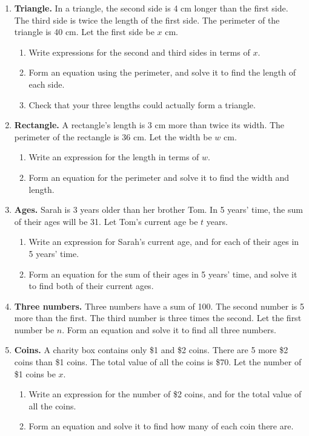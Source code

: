 \documentclass[11pt]{article}
\newcommand{\qspace}{\vspace{1.0cm}}
\begin{document}
\begin{enumerate}
  \item \textbf{Triangle.} In a triangle, the second side is 4 cm longer than the first side. The third side is twice the length of the first side. The perimeter of the triangle is 40 cm. Let the first side be $x$ cm.
  \begin{enumerate}
    \item Write expressions for the second and third sides in terms of $x$.
    \item Form an equation using the perimeter, and solve it to find the length of each side.
    \item Check that your three lengths could actually form a triangle.
  \end{enumerate}
  \qspace

  \item \textbf{Rectangle.} A rectangle's length is 3 cm more than twice its width. The perimeter of the rectangle is 36 cm. Let the width be $w$ cm.
  \begin{enumerate}
    \item Write an expression for the length in terms of $w$.
    \item Form an equation for the perimeter and solve it to find the width and length.
  \end{enumerate}
  \qspace

  \item \textbf{Ages.} Sarah is 3 years older than her brother Tom. In 5 years' time, the sum of their ages will be 31. Let Tom's current age be $t$ years.
  \begin{enumerate}
    \item Write an expression for Sarah's current age, and for each of their ages in 5 years' time.
    \item Form an equation for the sum of their ages in 5 years' time, and solve it to find both of their current ages.
  \end{enumerate}
  \qspace

  \item \textbf{Three numbers.} Three numbers have a sum of 100. The second number is 5 more than the first. The third number is three times the second. Let the first number be $n$. Form an equation and solve it to find all three numbers.
  \qspace

  \item \textbf{Coins.} A charity box contains only \$1 and \$2 coins. There are 5 more \$2 coins than \$1 coins. The total value of all the coins is \$70. Let the number of \$1 coins be $x$.
  \begin{enumerate}
    \item Write an expression for the number of \$2 coins, and for the total value of all the coins.
    \item Form an equation and solve it to find how many of each coin there are.
  \end{enumerate}
  \qspace


\end{enumerate}
\end{document}
